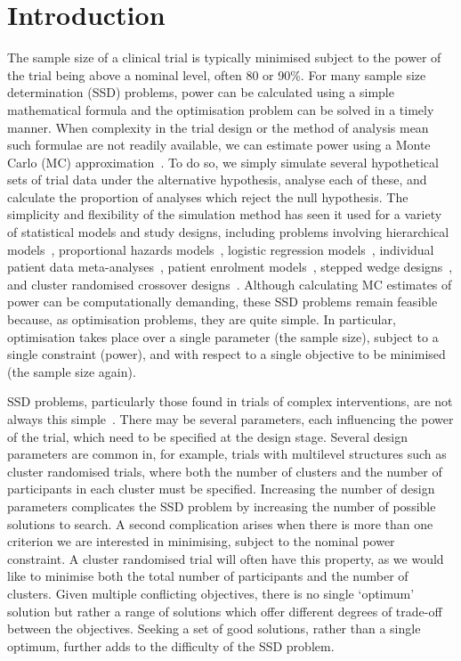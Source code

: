 \documentclass[sagev, doublespace, Crown]{sagej}
\begin{document}
\section{Introduction}\label{sec:intro}

The sample size of a clinical trial is typically minimised subject to the power of the trial being above a nominal level, often 80 or 90\%. For many sample size determination (SSD) problems, power can be calculated using a simple mathematical formula and the optimisation problem can be solved in a timely manner. When complexity in the trial design or the method of analysis mean such formulae are not readily available, we can estimate power using a Monte Carlo (MC) approximation~\cite{Arnold2011, Landau2013}. To do so, we simply simulate several hypothetical sets of trial data under the alternative hypothesis, analyse each of these, and calculate the proportion of analyses which reject the null hypothesis. The simplicity and flexibility of the simulation method has seen it used for a variety of statistical models and study designs, including problems involving hierarchical models~\cite{Feng1992, Hooper2013}, proportional hazards models~\cite{Schoenfeld2005}, logistic regression models~\cite{Grieve2016}, individual patient data meta-analyses~\cite{Sutton2007, Kontopantelis2016}, patient enrolment models~\cite{Fedorov2005}, stepped wedge designs~\cite{Baio2015, Hooper2016}, and cluster randomised crossover designs~\cite{Reich2012}. Although calculating MC estimates of power can be computationally demanding, these SSD problems remain feasible because, as optimisation problems, they are quite simple. In particular, optimisation takes place over a single parameter (the sample size), subject to a single constraint (power), and with respect to a single objective to be minimised (the sample size again).

SSD problems, particularly those found in trials of complex interventions, are not always this simple~\cite{Wilson2015}. There may be several parameters, each influencing the power of the trial, which need to be specified at the design stage. Several design parameters are common in, for example, trials with multilevel structures such as cluster randomised trials, where both the number of clusters and the number of participants in each cluster must be specified. Increasing the number of design parameters complicates the SSD problem by increasing the number of possible solutions to search. A second complication arises when there is more than one criterion we are interested in minimising, subject to the nominal power constraint. A cluster randomised trial will often have this property, as we would like to minimise both the total number of participants and the number of clusters. Given multiple conflicting objectives, there is no single `optimum' solution but rather a range of solutions which offer different degrees of trade-off between the objectives. Seeking a set of good solutions, rather than a single optimum, further adds to the difficulty of the SSD problem.
\end{document}
